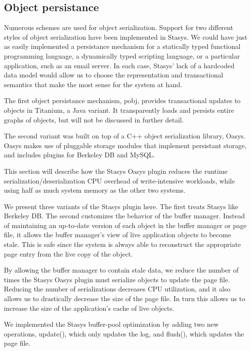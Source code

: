 \documentclass[letterpaper,twocolumn,10pt]{article}
\newcommand{\yad}{Stasys\xspace}
\newcommand{\yads}{Stasys'\xspace}
\newcommand{\oasys}{Oasys\xspace}
\begin{document}
\subsection{Object persistance}
\label{sec:oasys}
Numerous schemes are used for object serialization.  Support for two
different styles of object serialization have been implemented in
\yad.  We could have just as easily implemented a persistance
mechanism for a statically typed functional programming language, a
dynamically typed scripting language, or a particular application,
such as an email server.  In each case, \yads lack of a hardcoded data
model would allow us to choose the representation and transactional
semantics that make the most sense for the system at hand.

The first object persistance mechanism, pobj, provides transactional updates to objects in
Titanium, a Java variant.  It transparently loads and persists
entire graphs of objects, but will not be discussed in further detail.

The second variant was built on top of a C++ object
serialization library, \oasys.  \oasys makes use of pluggable storage
modules that implement persistant storage, and includes plugins
for Berkeley DB and MySQL.  

This section will describe how the \yad
\oasys plugin reduces the runtime serialization/deserialization CPU
overhead of write-intensive workloads, while using half as much system
memory as the other two systems.

We present three variants of the \yad plugin here.  The first treats \yad like
Berkeley DB.  The second customizes the behavior of the buffer
manager.  Instead of maintaining an up-to-date version of each object
in the buffer manager or page file, it allows the buffer manager's
view of live application objects to become stale.  This is safe since
the system is always able to reconstruct the appropriate page entry
from the live copy of the object.

By allowing the buffer manager to contain stale data, we reduce the
number of times the \yad \oasys plugin must serialize objects to
update the page file.  Reducing the number of serializations decreases
CPU utilization, and it also allows us to drastically decrease the
size of the page file.  In turn this allows us to increase the size of
the application's cache of live objects.

We implemented the \yad buffer-pool optimization by adding two new
operations, update(), which only updates the log, and flush(), which
updates the page file.  
\end{document}
